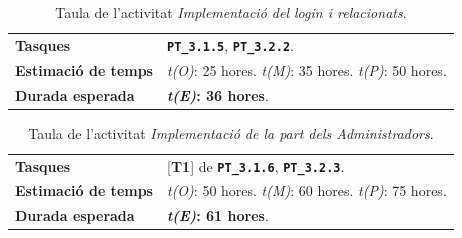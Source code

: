 \documentclass[a4paper,12pt]{ThesisStyle}
\begin{document}
\begin{table}[H]
  \begin{tabularx}{\textwidth}{l | X}
    \toprule
    \rowcolor{Blue}
    \multicolumn{2}{c}{\texttt{\textbf{A11:}} Implementació del \textit{login} i relacionats}\\
    \midrule[0.9pt]
    \textbf{Tasques}                 & \texttt{\textbf{PT\_3.1.5}}, \texttt{\textbf{PT\_3.2.2}}.\\
    \midrule
    \textbf{Estimació de temps}      & \textit{t(O)}: 25 hores.
    \newline \textit{t(M)}: 35 hores.
    \newline \textit{t(P)}: 50 hores.\\
    \midrule
    \textbf{Durada esperada}         & \textbf{\textit{t(E)}: 36 hores}.\\
    \bottomrule
  \end{tabularx}
  \caption{\label{taula:a11} Taula de l'activitat \emph{Implementació del \textit{login} i relacionats}.}
\end{table}

\begin{table}[H]
  \begin{tabularx}{\textwidth}{l | X}
    \toprule
    \rowcolor{Blue}
    \multicolumn{2}{c}{\texttt{\textbf{A12:}} Implementació de la part dels Administradors}\\
    \midrule[0.9pt]
    \textbf{Tasques}                 & [\textbf{T1}] de \texttt{\textbf{PT\_3.1.6}}, \texttt{\textbf{PT\_3.2.3}}.\\
    \midrule
    \textbf{Estimació de temps}      & \textit{t(O)}: 50 hores.
    \newline \textit{t(M)}: 60 hores.
    \newline \textit{t(P)}: 75 hores.\\
    \midrule
    \textbf{Durada esperada}         & \textbf{\textit{t(E)}: 61 hores}.\\
    \bottomrule
  \end{tabularx}
  \caption{\label{taula:a12} Taula de l'activitat \emph{Implementació de la part dels Administradors}.}
\end{table}
\end{document}
